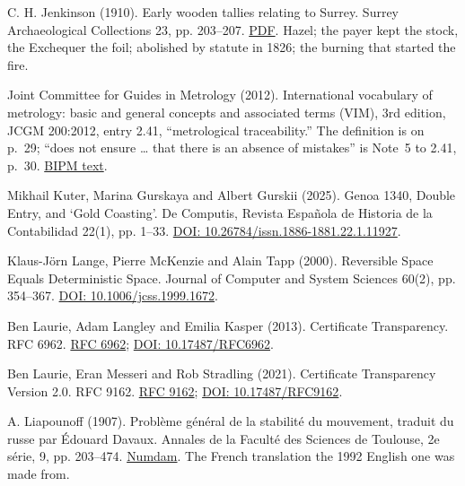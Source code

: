 \documentclass[11pt,twoside]{article}
\theoremstyle{thielethm}
\theoremstyle{thieledef}
\theoremstyle{thieledef}
\theoremstyle{thieledef}
\theoremstyle{thielethm}
\theoremstyle{thieleobs}
\theoremstyle{thielethm}
\begin{document}
\noindent C. H. Jenkinson (1910). Early wooden tallies relating to Surrey. Surrey Archaeological Collections 23, pp. 203--207. \href{https://archaeologydataservice.ac.uk/catalogue/adsdata/arch-379-1/dissemination/pdf/vol_23/surreyac023_203-207_jenkinson.pdf}{PDF}. Hazel; the payer kept the stock, the Exchequer the foil; abolished by statute in 1826; the burning that started the fire.
\par\medskip

\noindent Joint Committee for Guides in Metrology (2012). International vocabulary of metrology: basic and general concepts and associated terms (VIM), 3rd edition, JCGM 200:2012, entry 2.41, ``metrological traceability.'' The definition is on p.~29; ``does not ensure \ldots{} that there is an absence of mistakes'' is Note~5 to 2.41, p.~30. \href{https://www.bipm.org/documents/20126/2071204/JCGM_200_2012.pdf}{BIPM text}.
\par\medskip

\noindent Mikhail Kuter, Marina Gurskaya and Albert Gurskii (2025). Genoa 1340, Double Entry, and `Gold Coasting'. De Computis, Revista Española de Historia de la Contabilidad 22(1), pp. 1--33. \href{https://doi.org/10.26784/issn.1886-1881.22.1.11927}{DOI: 10.26784/issn.1886-1881.22.1.11927}.
\par\medskip

\noindent Klaus-J\"orn Lange, Pierre McKenzie and Alain Tapp (2000). Reversible Space Equals Deterministic Space. Journal of Computer and System Sciences 60(2), pp. 354--367. \href{https://doi.org/10.1006/jcss.1999.1672}{DOI: 10.1006/jcss.1999.1672}.
\par\medskip

\noindent Ben Laurie, Adam Langley and Emilia Kasper (2013). Certificate Transparency. RFC 6962. \href{https://www.rfc-editor.org/rfc/rfc6962.html}{RFC 6962}; \href{https://doi.org/10.17487/RFC6962}{DOI: 10.17487/RFC6962}.
\par\medskip

\noindent Ben Laurie, Eran Messeri and Rob Stradling (2021). Certificate Transparency Version 2.0. RFC 9162. \href{https://www.rfc-editor.org/rfc/rfc9162.html}{RFC 9162}; \href{https://doi.org/10.17487/RFC9162}{DOI: 10.17487/RFC9162}.
\par\medskip

\noindent A. Liapounoff (1907). Problème général de la stabilité du mouvement, traduit du russe par Édouard Davaux. Annales de la Faculté des Sciences de Toulouse, 2e série, 9, pp. 203--474. \href{http://www.numdam.org/item?id=AFST_1907_2_9__203_0}{Numdam}. The French translation the 1992 English one was made from.
\par\medskip
\end{document}
